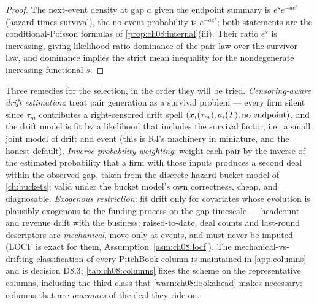 \begin{proof}
The next-event density at gap $a$ given the endpoint summary is
$e^{s} e^{-a e^{s}}$ (hazard times survival), the no-event probability is
$e^{-a e^{s}}$; both statements are the conditional-Poisson formulas of
\cref{prop:ch08:internal}(iii). Their ratio $e^s$ is increasing, giving
likelihood-ratio dominance of the pair law over the survivor law, and
dominance implies the strict mean inequality for the nondegenerate
increasing functional $s$.
\end{proof}

Three remedies for the selection, in the order they will be tried.
\emph{Censoring-aware drift estimation}: treat pair generation as a
survival problem --- every firm silent since $\tau_m$ contributes a
right-censored drift spell $(x_i(\tau_m), a_i(T),
\text{no endpoint})$, and the drift model is fit by a likelihood that
includes the survival factor, i.e.\ a small joint model of drift and
event (this is R4's machinery in miniature, and the honest default).
\emph{Inverse-probability weighting}: weight each pair by the inverse of
the estimated probability that a firm with those inputs produces a
second deal within the observed gap, taken from the discrete-hazard
bucket model of \cref{ch:buckets}; valid under the bucket model's own
correctness, cheap, and diagnosable. \emph{Exogenous restriction}: fit
drift only for covariates whose evolution is plausibly exogenous to the
funding process on the gap timescale --- headcount and revenue drift
with the business; raised-to-date, deal counts and last-round
descriptors are \emph{mechanical}, move only at events, and must never
be imputed (LOCF is exact for them, Assumption~\ref{asm:ch08:locf}). The
mechanical-vs-drifting classification of every PitchBook column is
maintained in \cref{app:columns} and is decision D8.3;
\cref{tab:ch08:columns} fixes the scheme on the representative columns,
including the third class that \cref{warn:ch08:lookahead} makes
necessary: columns that are \emph{outcomes} of the deal they ride on.

